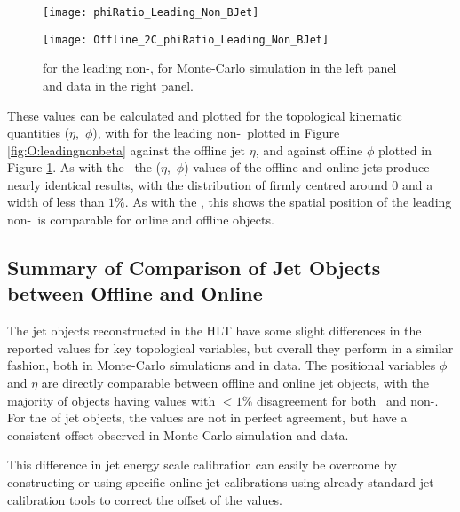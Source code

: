 	\begin{figure}[h]
		\centering
		\begin{minipage}[h]{0.47\linewidth}
			\texttt{[image: phiRatio\_Leading\_Non\_BJet]}

		\end{minipage}
		\begin{minipage}[h]{0.47\linewidth}
			\texttt{[image: Offline\_2C\_phiRatio\_Leading\_Non\_BJet]}
		\end{minipage}
		\caption[\dphph for the leading non-\bjet\ in data and Monte-Carlo simulations]{\dphph for the leading non-\bjet, for Monte-Carlo simulation in the left panel and data in the right panel.}
		\label{fig:O:leadingnonbphi}
	\end{figure}

	These \dxx values can be calculated and plotted for the topological kinematic quantities ($\eta$,~$\phi$), with \dee for the leading non-\bjet\ plotted in Figure \ref{fig:O:leadingnonbeta} against the offline jet $\eta$, and \dphph against offline $\phi$ plotted in Figure \ref{fig:O:leadingnonbphi}. As with the \bjets\, the ($\eta$,~$\phi$) values of the offline and online jets produce nearly identical results, with the distribution of \dxx firmly centred around 0 and a width of less than $1\%$. As with the \bjets, this shows the spatial position of the leading non-\bjet\ is comparable for online and offline objects.


	\subsection{Summary of Comparison of Jet Objects between Offline and Online}
	\label{obp:jetsum}

		The jet objects reconstructed in the HLT have some slight differences in the reported values for key topological variables, but overall they perform in a similar fashion, both in Monte-Carlo simulations and in data. The positional variables $\phi$ and $\eta$ are directly comparable between offline and online jet objects, with the majority of objects having values with $<1\%$ disagreement for both \bjets\ and non-\bjets. For the \pt of jet objects, the values are not in perfect agreement, but have a consistent offset observed in Monte-Carlo simulation and data.

		This difference in jet energy scale calibration can easily be overcome by constructing  or using specific online jet calibrations using already standard jet calibration tools \cite{JES, jetcalib} to correct the offset of the \pt values.

